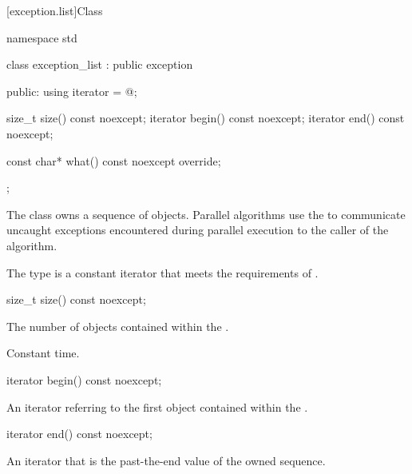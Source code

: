 [exception.list]{Class }

\begin{codeblock}
namespace std {
  class exception_list : public exception {
  public:
    using iterator = @\unspec@;

    size_t size() const noexcept;
    iterator begin() const noexcept;
    iterator end() const noexcept;

    const char* what() const noexcept override;
  };
}
\end{codeblock}

\pnum
The class  owns a sequence of 
objects. Parallel algorithms use the  to communicate
uncaught exceptions encountered during parallel execution to the caller of the
algorithm.

\pnum
The type  is a constant iterator that meets the
requirements of .

\begin{itemdecl}
size_t size() const noexcept;
\end{itemdecl}

\begin{itemdescr}
\pnum
\returns
The number of  objects contained within the
.

\pnum
\complexity
Constant time.
\end{itemdescr}

\begin{itemdecl}
iterator begin() const noexcept;
\end{itemdecl}

\begin{itemdescr}
\pnum
\returns
An iterator referring to the first  object contained
within the .
\end{itemdescr}

\begin{itemdecl}
iterator end() const noexcept;
\end{itemdecl}

\begin{itemdescr}
\pnum
\returns
An iterator that is the past-the-end value of the owned sequence.
\end{itemdescr}

